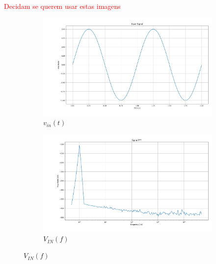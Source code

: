 \textcolor{red}{Decidam se querem usar estas imagens}

\begin{figure}[H]
    \centering

    \begin{subfigure}[b]{0.4\textwidth}
        \centering
        \includegraphics[width=\textwidth]{Images/Vin_tempo_ideal.png}
        \caption{$v_{in}(t)$}
        \label{fig:Vin_tempo_ideal}
    \end{subfigure}%
    \begin{subfigure}[b]{0.4\textwidth}
        \centering
        \includegraphics[width=\textwidth]{Images/Vin_ideal.png}
        \caption{$V_{IN}(f)$}
        \label{fig:Vin_freq_ideal}
    \end{subfigure}


\end{figure}
